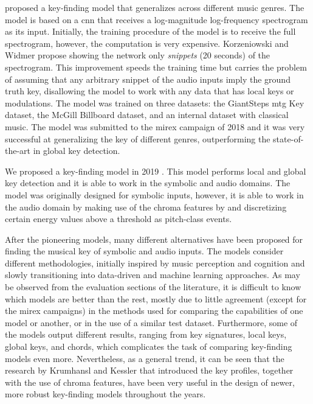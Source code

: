 \textcite{korzeniowski2018genreagnostic} proposed a
key-finding model that generalizes across different music
genres. The model is based on a \gls{cnn} that receives a
log-magnitude log-frequency spectrogram as its input.
Initially, the training procedure of the model is to receive
the full spectrogram, however, the computation is very
expensive. Korzeniowski and Widmer propose showing the
network only \emph{snippets} (20 seconds) of the
spectrogram. This improvement speeds the training time but
carries the problem of assuming that any arbitrary snippet
of the audio inputs imply the ground truth key, disallowing
the model to work with any data that has local keys or
modulations. The model was trained on three datasets: the
GiantSteps \gls{mtg} Key dataset, the McGill Billboard
dataset, and an internal dataset with classical music. The
model was submitted to the \gls{mirex} campaign of 2018 and
it was very successful at generalizing the key of different
genres, outperforming the state-of-the-art in global key
detection.


We proposed a key-finding model in 2019
\parencite{napoleslopez2019keyfinding}. This model performs
local and global key detection and it is able to work in the
symbolic and audio domains. The model was originally
designed for symbolic inputs, however, it is able to work in
the audio domain by making use of the chroma features by
\textcite{mauch2010approximate} and discretizing certain
energy values above a threshold as pitch-class events.

After the pioneering models, many different alternatives
have been proposed for finding the musical key of symbolic
and audio inputs. The models consider different
methodologies, initially inspired by music perception and
cognition and slowly transitioning into data-driven and
machine learning approaches. As may be observed from the
evaluation sections of the literature, it is difficult to
know which models are better than the rest, mostly due to
little agreement (except for the \gls{mirex} campaigns) in
the methods used for comparing the capabilities of one model
or another, or in the use of a similar test dataset.
Furthermore, some of the models output different results,
ranging from key signatures, local keys, global keys, and
chords, which complicates the task of comparing key-finding
models even more. Nevertheless, as a general trend, it can
be seen that the research by Krumhansl and Kessler that
introduced the key profiles, together with the use of chroma
features, have been very useful in the design of newer, more
robust key-finding models throughout the years.
